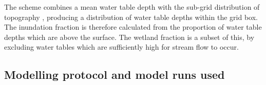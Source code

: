 The scheme combines a mean water table depth with the sub-grid distribution of topography \citep{Gedney2019}, producing a distribution of water table depths within the grid box. The inundation fraction is therefore calculated from the proportion of water table depths which are above the surface. The wetland fraction is a subset of this, by excluding water tables which are sufficiently high for stream flow to occur.



\subsection{Modelling protocol and model runs used}

